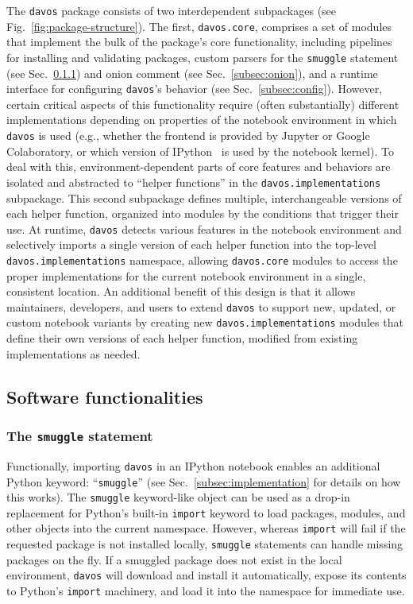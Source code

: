 \documentclass[preprint,12pt,a4paper]{elsarticle}
\begin{document}
The \texttt{davos} package consists of two interdependent subpackages
(see Fig.~\ref{fig:package-structure}). The first,
\texttt{davos.core}, comprises a set of modules that
implement the bulk of the package's core
functionality, including pipelines for installing and validating
packages, custom parsers for the \texttt{smuggle} statement (see
Sec.~\ref{subsec:smuggle}) and onion comment (see
Sec.~\ref{subsec:onion}), and a runtime interface for configuring
\texttt{davos}'s behavior (see Sec.~\ref{subsec:config}). However,
certain critical aspects of this
functionality require (often substantially) different implementations
depending on properties of the notebook environment in which
\texttt{davos} is used (e.g., whether the frontend is provided by
Jupyter or Google Colaboratory, or which version of
IPython~\cite{PereGran07} is used by the notebook kernel). To deal
with this, environment-dependent parts of core features and behaviors
are isolated and abstracted to ``helper functions'' in the
\texttt{davos.implementations} subpackage. This second subpackage
defines multiple, interchangeable versions of each helper function,
organized into modules by the conditions that trigger their use. At
runtime, \texttt{davos} detects various features in the notebook
environment and selectively imports a single version of each helper
function into the top-level \texttt{davos.implementations} namespace,
allowing \texttt{davos.core} modules to access the proper
implementations for the current notebook environment in a single,
consistent location. An additional benefit of this design is that it
allows maintainers, developers, and users to extend \texttt{davos} to
support new, updated, or custom notebook variants by creating new
\texttt{davos.implementations} modules that define their own versions
of each helper function, modified from existing implementations as
needed.

\subsection{Software functionalities}

\subsubsection{The \texttt{smuggle} statement}\label{subsec:smuggle}

Functionally, importing \texttt{davos} in an IPython notebook enables
an additional Python keyword: ``\texttt{smuggle}'' (see
Sec.~\ref{subsec:implementation} for details on how this works).
The \texttt{smuggle} keyword-like object can be used as a drop-in
replacement for Python's built-in \texttt{import} keyword to load
packages, modules, and other objects into the current namespace.
However, whereas \texttt{import} will fail if the requested package is
not installed locally, \texttt{smuggle} statements can handle missing
packages on the fly.  If a smuggled package does not exist in the
local environment, \texttt{davos} will download and install it automatically,
expose its contents to Python's \texttt{import} machinery, and load it
into the namespace for immediate use.
\end{document}
